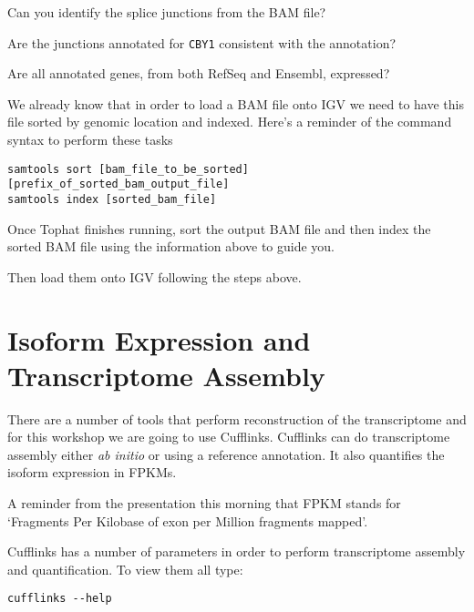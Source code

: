 \begin{questions}
Can you identify the splice junctions from the BAM file?
\begin{answer}
\end{answer}

Are the junctions annotated for \texttt{CBY1} consistent with the annotation?
\begin{answer}
\end{answer}

Are all annotated genes, from both RefSeq and Ensembl, expressed?
\begin{answer}
\end{answer}

\end{questions}

\begin{information}
We already know that in order to load a BAM file onto IGV we need to have
this file sorted by genomic location and indexed. Here's a reminder of the
command syntax to perform these tasks

\begin{lstlisting}
samtools sort [bam_file_to_be_sorted] [prefix_of_sorted_bam_output_file]
samtools index [sorted_bam_file]
\end{lstlisting}

\end{information}

\begin{steps}
Once Tophat finishes running, sort the output BAM file and then index the
sorted BAM file using the information above to guide you.

Then load them onto IGV following the steps above.
\end{steps}

\newpage
\section{Isoform Expression and Transcriptome Assembly}
There are a number of tools that perform reconstruction of the transcriptome
and for this workshop we are going to use Cufflinks. Cufflinks can do
transcriptome assembly either \textit{ab initio} or using a reference annotation. It
also quantifies the isoform expression in FPKMs.

A reminder from the presentation this morning that FPKM stands for `Fragments
Per Kilobase of exon per Million fragments mapped'. 

\begin{steps}
Cufflinks has a number of parameters in order to perform transcriptome
assembly and quantification. To view them all type:

\begin{lstlisting}
cufflinks --help
\end{lstlisting}
\end{steps}


